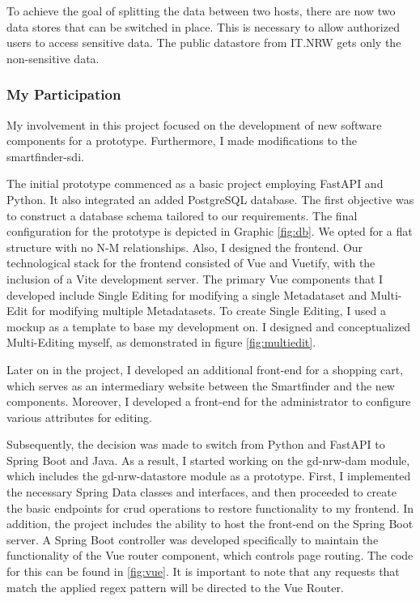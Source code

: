 \documentclass[11pt, titlepage, a4paper]{article}
\begin{document}
 To achieve the goal of splitting the data between two hosts, there are now two data stores that can be switched in place. This is necessary to allow authorized users to access sensitive data. The public datastore from IT.NRW gets only the non-sensitive data.

\subsubsection{My Participation}
My involvement in this project focused on the development of new software components for a prototype. Furthermore, I made modifications to the smartfinder-sdi.



The initial prototype commenced as a basic project employing FastAPI and Python. It also integrated an added PostgreSQL database. The first objective was to construct a database schema tailored to our requirements. The final configuration for the prototype is depicted in Graphic \ref{fig:db}. We opted for a flat structure with no N-M relationships.
Also, I designed the frontend. Our technological stack for the frontend consisted of Vue and Vuetify, with the inclusion of a Vite development server. The primary Vue components that I developed include Single Editing for modifying a single Metadataset and Multi-Edit for modifying multiple Metadatasets. To create Single Editing, I used a mockup as a template to base my development on. I designed and conceptualized Multi-Editing myself, as demonstrated in figure \ref{fig:multiedit}.

Later on in the project, I developed an additional front-end for a shopping cart, which serves as an intermediary website between the Smartfinder and the new components. Moreover, I developed a front-end for the administrator to configure various attributes for editing.




Subsequently, the decision was made to switch from Python and FastAPI to Spring Boot and Java. As a result, I started working on the gd-nrw-dam module, which includes the gd-nrw-datastore module as a prototype. First, I implemented the necessary Spring Data classes and interfaces, and then proceeded to create the basic endpoints for \gls{crud} operations to restore functionality to my frontend. In addition, the project includes the ability to host the front-end on the Spring Boot server. A Spring Boot controller was developed specifically to maintain the functionality of the Vue router component, which controls page routing. The code for this can be found in 
\ref{fig:vue}. It is important to note that any requests that match the applied regex pattern will be directed to the Vue Router.
\end{document}
